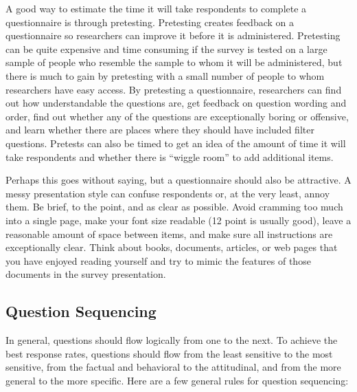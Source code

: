A good way to estimate the time it will take respondents to complete a questionnaire is through pretesting. Pretesting creates feedback on a questionnaire so researchers can improve it before it is administered. Pretesting can be quite expensive and time consuming if the survey is tested on a large sample of people who resemble the sample to whom it will be administered, but there is much to gain by pretesting with a small number of people to whom researchers have easy access. By pretesting a questionnaire, researchers can find out how understandable the questions are, get feedback on question wording and order, find out whether any of the questions are exceptionally boring or offensive, and learn whether there are places where they should have included filter questions. Pretests can also be timed to get an idea of the amount of time it will take respondents and whether there is ``wiggle room'' to add additional items.

Perhaps this goes without saying, but a questionnaire should also be attractive. A messy presentation style can confuse respondents or, at the very least, annoy them. Be brief, to the point, and as clear as possible. Avoid cramming too much into a single page, make your font size readable (12 point is usually good), leave a reasonable amount of space between items, and make sure all instructions are exceptionally clear. Think about books, documents, articles, or web pages that you have enjoyed reading yourself and try to mimic the features of those documents in the survey presentation.

\subsection{Question Sequencing}

In general, questions should flow logically from one to the next. To achieve the best response rates, questions should flow from the least sensitive to the most sensitive, from the factual and behavioral to the attitudinal, and from the more general to the more specific. Here are a few general rules for question sequencing:

